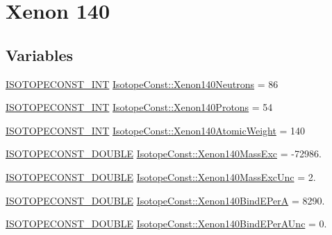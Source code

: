 \hypertarget{group___isotope_const-_xenon-_xe140}{}\section{Xenon 140}
\label{group___isotope_const-_xenon-_xe140}
\subsection*{Variables}
\begin{DoxyCompactItemize}
\item 
\mbox{\hyperlink{group___isotope_const-_macros_ga5f18360b3e99483a35c32d789e62621c}{I\+S\+O\+T\+O\+P\+E\+C\+O\+N\+S\+T\+\_\+\+I\+NT}} \mbox{\hyperlink{group___isotope_const-_xenon-_xe140_ga1985ed24e52ae0200d9dfe80c323749f}{Isotope\+Const\+::\+Xenon140\+Neutrons}} = 86
\item 
\mbox{\hyperlink{group___isotope_const-_macros_ga5f18360b3e99483a35c32d789e62621c}{I\+S\+O\+T\+O\+P\+E\+C\+O\+N\+S\+T\+\_\+\+I\+NT}} \mbox{\hyperlink{group___isotope_const-_xenon-_xe140_gaf4c73ea77cb4768ddca20debd21d473c}{Isotope\+Const\+::\+Xenon140\+Protons}} = 54
\item 
\mbox{\hyperlink{group___isotope_const-_macros_ga5f18360b3e99483a35c32d789e62621c}{I\+S\+O\+T\+O\+P\+E\+C\+O\+N\+S\+T\+\_\+\+I\+NT}} \mbox{\hyperlink{group___isotope_const-_xenon-_xe140_ga1a26bba7aee31703295db30b7c418f46}{Isotope\+Const\+::\+Xenon140\+Atomic\+Weight}} = 140
\item 
\mbox{\hyperlink{group___isotope_const-_macros_ga8f45a7272ce02c0b4c65c44636ed719a}{I\+S\+O\+T\+O\+P\+E\+C\+O\+N\+S\+T\+\_\+\+D\+O\+U\+B\+LE}} \mbox{\hyperlink{group___isotope_const-_xenon-_xe140_gaf837cb1bda6713e9c90e22e098ebf5ac}{Isotope\+Const\+::\+Xenon140\+Mass\+Exc}} = -\/72986.
\item 
\mbox{\hyperlink{group___isotope_const-_macros_ga8f45a7272ce02c0b4c65c44636ed719a}{I\+S\+O\+T\+O\+P\+E\+C\+O\+N\+S\+T\+\_\+\+D\+O\+U\+B\+LE}} \mbox{\hyperlink{group___isotope_const-_xenon-_xe140_gadc2ed7cc3b7696e94d18318dc0705363}{Isotope\+Const\+::\+Xenon140\+Mass\+Exc\+Unc}} = 2.
\item 
\mbox{\hyperlink{group___isotope_const-_macros_ga8f45a7272ce02c0b4c65c44636ed719a}{I\+S\+O\+T\+O\+P\+E\+C\+O\+N\+S\+T\+\_\+\+D\+O\+U\+B\+LE}} \mbox{\hyperlink{group___isotope_const-_xenon-_xe140_ga1b74533b85357e2cb9f912bdf1f083fa}{Isotope\+Const\+::\+Xenon140\+Bind\+E\+PerA}} = 8290.
\item 
\mbox{\hyperlink{group___isotope_const-_macros_ga8f45a7272ce02c0b4c65c44636ed719a}{I\+S\+O\+T\+O\+P\+E\+C\+O\+N\+S\+T\+\_\+\+D\+O\+U\+B\+LE}} \mbox{\hyperlink{group___isotope_const-_xenon-_xe140_gafa027be2cea04a6d4559fdf0c836723e}{Isotope\+Const\+::\+Xenon140\+Bind\+E\+Per\+A\+Unc}} = 0.

\end{DoxyCompactItemize}

